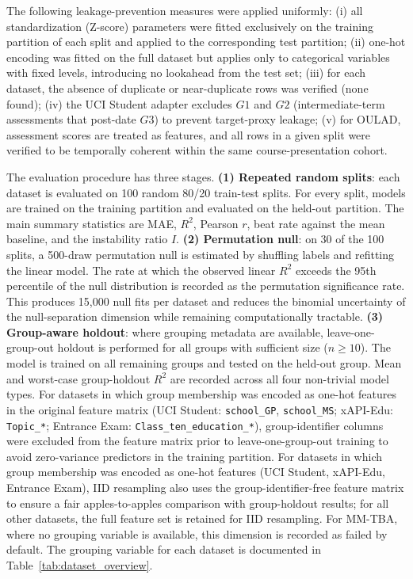 \documentclass[10pt,letterpaper]{wlscirep}
\begin{document}
The following leakage-prevention measures were applied uniformly: (i) all standardization (Z-score) parameters were fitted exclusively on the training partition of each split and applied to the corresponding test partition; (ii) one-hot encoding was fitted on the full dataset but applies only to categorical variables with fixed levels, introducing no lookahead from the test set; (iii) for each dataset, the absence of duplicate or near-duplicate rows was verified (none found); (iv) the UCI Student adapter excludes $G1$ and $G2$ (intermediate-term assessments that post-date $G3$) to prevent target-proxy leakage; (v) for OULAD, assessment scores are treated as features, and all rows in a given split were verified to be temporally coherent within the same course-presentation cohort.

The evaluation procedure has three stages. \textbf{(1) Repeated random splits}: each dataset is evaluated on 100 random 80/20 train-test splits. For every split, models are trained on the training partition and evaluated on the held-out partition. The main summary statistics are MAE, $R^2$, Pearson $r$, beat rate against the mean baseline, and the instability ratio $I$. \textbf{(2) Permutation null}: on 30 of the 100 splits, a 500-draw permutation null is estimated by shuffling labels and refitting the linear model. The rate at which the observed linear $R^2$ exceeds the 95th percentile of the null distribution is recorded as the permutation significance rate. This produces 15{,}000 null fits per dataset and reduces the binomial uncertainty of the null-separation dimension while remaining computationally tractable. \textbf{(3) Group-aware holdout}: where grouping metadata are available, leave-one-group-out holdout is performed for all groups with sufficient size ($n \geq 10$). The model is trained on all remaining groups and tested on the held-out group. Mean and worst-case group-holdout $R^2$ are recorded across all four non-trivial model types. For datasets in which group membership was encoded as one-hot features in the original feature matrix (UCI Student: \texttt{school\_GP}, \texttt{school\_MS}; xAPI-Edu: \texttt{Topic\_*}; Entrance Exam: \texttt{Class\_ten\_education\_*}), group-identifier columns were excluded from the feature matrix prior to leave-one-group-out training to avoid zero-variance predictors in the training partition. For datasets in which group membership was encoded as one-hot features (UCI Student, xAPI-Edu, Entrance Exam), IID resampling also uses the group-identifier-free feature matrix to ensure a fair apples-to-apples comparison with group-holdout results; for all other datasets, the full feature set is retained for IID resampling. For MM-TBA, where no grouping variable is available, this dimension is recorded as failed by default. The grouping variable for each dataset is documented in Table~\ref{tab:dataset_overview}.
\end{document}

